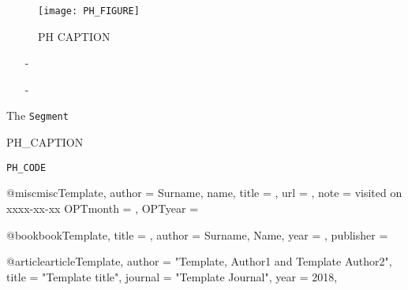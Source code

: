 \begin{figure}[H]
	\centering
	\texttt{[image: PH\_FIGURE]}
	\caption{PH CAPTION}
	\label{fig:PH_LABEL}
\end{figure}

\begin{itemize}\label{stuff}
	\item[-] 
\end{itemize}

\begin{enumerate}
	\item [-]
\end{enumerate}

The \texttt{Segment}

\begin{listing}[H]
	\caption{PH_CAPTION}
	\label{listing:PH_LABEL}
	\begin{verbatim}
PH_CODE
	\end{verbatim}
\end{listing}

@misc{miscTemplate,
	author = {Surname, name},
	title = {},
	url = {},
	note = {visited on xxxx-xx-xx}
	OPTmonth = {},
	OPTyear = {}
}

@book{bookTemplate,
	title = {},
	author = {Surname, Name},
	year = {},
	publisher = {}
}

@article{articleTemplate,
  author  = "Template, Author1 and Template Author2",
  title   = "Template title",
  journal = "Template Journal",
  year    = 2018,
}